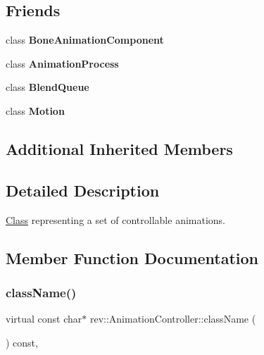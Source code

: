\subsection*{Friends}
\begin{DoxyCompactItemize}
\item 
\mbox{\label{classrev_1_1_animation_controller_a68369f3d806a081715c367d5ac0cbacc}} 
class {\bfseries Bone\+Animation\+Component}
\item 
\mbox{\label{classrev_1_1_animation_controller_a983bb6633dd2561e3954ebeb6c7a9e10}} 
class {\bfseries Animation\+Process}
\item 
\mbox{\label{classrev_1_1_animation_controller_aacf451d09c33bff0c7868b019f411fe8}} 
class {\bfseries Blend\+Queue}
\item 
\mbox{\label{classrev_1_1_animation_controller_a6c2266a15bd2360b3047560297f23316}} 
class {\bfseries Motion}
\end{DoxyCompactItemize}
\subsection*{Additional Inherited Members}


\subsection{Detailed Description}
\mbox{\hyperlink{struct_class}{Class}} representing a set of controllable animations. 

\subsection{Member Function Documentation}
\mbox{\label{classrev_1_1_animation_controller_a242d8be4d5939baeda4cde95c13cd1ef}} 
\subsubsection{\texorpdfstring{className()}{className()}}
{\footnotesize\ttfamily virtual const char$\ast$ rev\+::\+Animation\+Controller\+::class\+Name (\begin{DoxyParamCaption}{ }\end{DoxyParamCaption}) const\hspace{0.3cm}{\ttfamily [inline]}, {\ttfamily [virtual]}}




